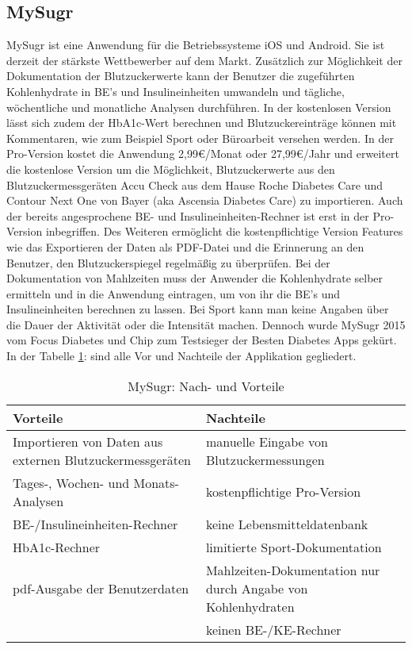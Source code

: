	\subsection{MySugr}
	MySugr ist eine Anwendung für die Betriebssysteme iOS und Android. Sie ist derzeit der stärkste Wettbewerber auf dem Markt. Zusätzlich zur Möglichkeit der Dokumentation der Blutzuckerwerte kann der Benutzer die zugeführten Kohlenhydrate in BE's und Insulineinheiten umwandeln und tägliche, wöchentliche und monatliche Analysen durchführen. In der kostenlosen Version lässt sich zudem der HbA1c-Wert berechnen und Blutzuckereinträge können mit Kommentaren, wie zum Beispiel \glqq Sport\grqq{} oder \glqq Büroarbeit\grqq{} versehen werden. In der Pro-Version kostet die Anwendung 2,99\euro{}/Monat oder 27,99\euro{}/Jahr und erweitert die kostenlose Version um die Möglichkeit, Blutzuckerwerte aus den Blutzuckermessgeräten \glqq Accu Check\grqq{} aus dem Hause Roche Diabetes Care und \glqq Contour Next One\grqq{} von Bayer (aka Ascensia Diabetes Care) zu importieren. Auch der bereits angesprochene BE- und Insulineinheiten-Rechner ist erst in der Pro-Version inbegriffen. Des Weiteren ermöglicht die kostenpflichtige Version Features wie das Exportieren der Daten als PDF-Datei und die Erinnerung an den Benutzer, den Blutzuckerspiegel regelmäßig zu überprüfen. Bei der Dokumentation von Mahlzeiten muss der Anwender die Kohlenhydrate selber ermitteln und in die Anwendung eintragen, um von ihr die BE’s und Insulineinheiten berechnen zu lassen. Bei Sport kann man keine Angaben über die Dauer der Aktivität oder die Intensität machen. Dennoch wurde MySugr 2015 vom Focus Diabetes und Chip zum Testsieger der \glqq Besten Diabetes Apps\grqq{} gekürt. In der Tabelle \ref{tab:MySugr}: \glqq {}\grqq{} sind alle Vor und Nachteile der Applikation gegliedert.\cite{MS}
	\begin{table}[H]
		\setlength{\tabcolsep}{12pt}
		\centering
		\begin{tabular}{p{6cm}|p{6cm}}
			\toprule
			\textbf{Vorteile} & \textbf{Nachteile}\\
			\hline
			Importieren von Daten aus externen Blutzuckermessgeräten & manuelle Eingabe von Blutzuckermessungen\\
			\hline
			Tages-, Wochen- und Monats-Analysen & kostenpflichtige Pro-Version\\
			\hline
			BE-/Insulineinheiten-Rechner & keine Lebensmitteldatenbank\\
			\hline
			HbA1c-Rechner & limitierte Sport-Dokumentation\\
			\hline
			pdf-Ausgabe der Benutzerdaten & Mahlzeiten-Dokumentation nur durch Angabe von Kohlenhydraten\\
			\hline
			& keinen BE-/KE-Rechner\\
			\bottomrule
		\end{tabular}
		\captionsetup{justification=centering}
		\caption{MySugr: Nach- und Vorteile}
		\label{tab:MySugr}
	\end{table}
